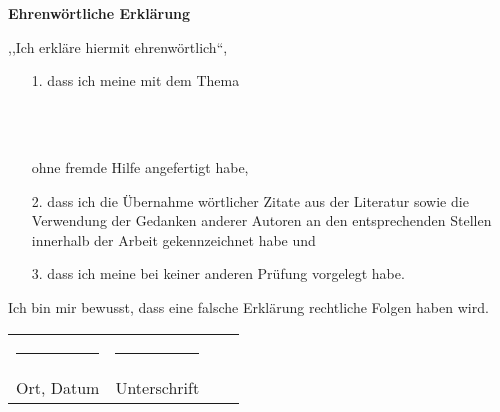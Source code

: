 \thispagestyle{empty}

\begin{center}
\textbf{\large Ehrenwörtliche Erklärung}
\end{center}
\vspace{0.5cm}
,,Ich erkläre hiermit ehrenwörtlich``,
\vspace{1cm}
\begin{enumerate}
\item[1.] dass ich meine  mit dem Thema

 \\
 \\

ohne fremde Hilfe angefertigt habe,

\item[2.] dass ich die Übernahme wörtlicher Zitate aus der Literatur sowie die
Verwendung der Gedanken anderer Autoren an den entsprechenden Stellen
innerhalb der Arbeit gekennzeichnet habe und

\item[3.] dass ich meine  bei keiner anderen Prüfung vor\-ge\-legt habe.

\end{enumerate}
\vspace{1cm}
Ich bin mir bewusst, dass eine falsche Erklärung rechtliche Folgen haben wird.
\vspace{2cm}

\begin{tabular}{p{7cm}lp{7cm}l}
\rule{7cm}{0.4pt} & \rule{7cm}{0.4pt} \\
Ort, Datum & Unterschrift \\
\end{tabular}
